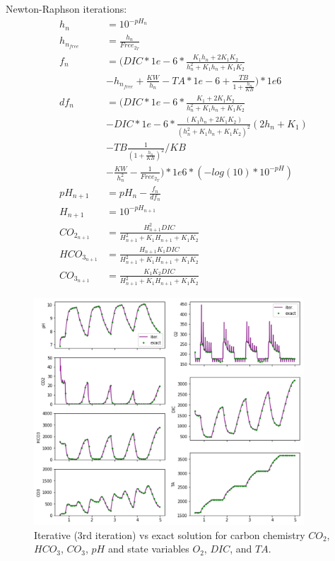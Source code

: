 \documentclass{ruthesis}
\begin{document}
Newton-Raphson iterations: 
\begin{align}
h_{n} 			&=  10^{-pH_{n}}\label{newton_raph_iterations1}	 \\
h_{n_{free}}	&=  \frac{h_n}{Free_{2_T}}	 \\
f_n				&= (  DIC*1e-6*\frac{K_1 h_n + 2 K_1 K_2}{h_n^2 + K_1 h_n + K_1 K_2}  \nonumber \\
&  - h_{n_{free}} + \frac{KW}{h_n} - TA*1e-6 + \frac{TB}{1+\frac{h_n}{KB}} )*1e6  \\
df_n 			&= (  DIC*1e-6*\frac{K_1 + 2 K_1 K_2}{h_n^2 + K_1 h_n + K_1 K_2}  \nonumber\\
&  -DIC*1e-6*\frac{(K_1 h_n + 2 K_1 K_2)}{(h_n^2 + K_1 h_n + K_1 K_2)^2}(2h_n + K_1) \nonumber\\
&  -TB \frac{1}{(1+ \frac{h_n}{KB})^2} / KB   \nonumber \\
&  -\frac{KW}{h_n^2} - \frac{1}{Free_{2_T}} )*1e6  * (-log(10)*10^{-pH}) \\
pH_{n+1}		&= pH_n - \frac{f_n}{df_n}  \\
H_{n+1} 		&= 10^{-pH_{n+1}}  \\
CO_{2_{n+1}}  		&= \frac{H_{n+1}^2 DIC}{H_{n+1}^2 + K_1 H_{n+1} + K_1 K_2}  \\
HCO_{3_{n+1}} 		&= \frac{H_{n+1} K_1 DIC}{H_{n+1}^2 + K_1 H_{n+1} + K_1 K_2}  \\
CO_{3_{n+1}}  		&= \frac{K_1 K_2 DIC}{H_{n+1}^2 + K_1 H_{n+1} + K_1 K_2}\label{newton_raph_iterations_end} 
\end{align}




\begin{figure}
	\centerline{\includegraphics[width=0.9\textwidth]{images_microalgae/plots/iterative_carbon_and_states}}
	\caption[.]{Iterative (3rd iteration) vs exact solution for carbon chemistry $CO_2$, $HCO_3$, $CO_3$, $pH$ and state variables $O_2$, $DIC$, and $TA$.}
	\label{fig:iterative_carbon_and_states}
\end{figure}
\end{document}
